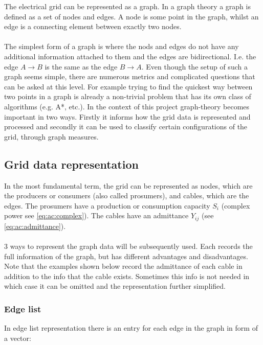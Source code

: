 The electrical grid can be represented as a graph. 
In a graph theory a graph is defined as a set of nodes and edges. A node
is some point in the graph, whilst an edge is a connecting element between exactly
two nodes.\\
\\

The simplest form of a graph is where the nods and edges do not have
any additional information attached to them and the edges are bidirectional.
I.e. the edge $A \to B$ is the same as the edge $B \to A$. Even though the setup
of such a graph seems simple, there are numerous metrics and complicated questions
that can be asked at this level. For example trying to find the quickest way between
two points in a graph is already a non-trivial problem that has its own class of algorithms
(e.g. A*, etc.). In the context of this project graph-theory becomes important in two ways.
Firstly it informs how the grid data is represented and processed and secondly it can
be used to classify certain configurations of the grid, through graph measures.

\subsection{Grid data representation}

In the most fundamental term, the grid can be represented as nodes,
which are the 
producers or consumers (also called prosumers), and cables, which are the edges.
The prosumers have a production or consumption capacity $S_i$ (complex power see \autoref{eq:ac:complex}).
The cables have an admittance $Y_{ij}$ (see \autoref{eq:ac:admittance}).\\
\\
3 ways to represent the graph data will be subsequently used. 
Each records the full information of the graph, but
has different advantages and disadvantages. Note that the examples shown below record
the admittance of each cable in addition to the info that the cable exists. Sometimes
this info is not needed in which case it can be omitted and the representation further simplified.

\subsubsection{Edge list}\label{sec:graph_theory:edge_list}

In edge list representation there is an entry for each edge in the graph in form of a vector:

